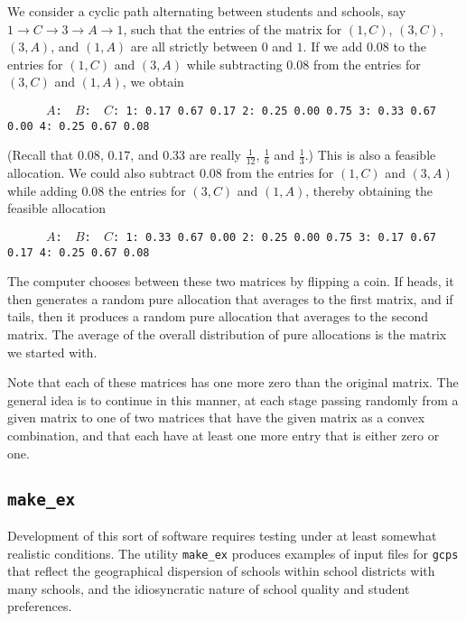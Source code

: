 \documentclass[12pt]{article}
\theoremstyle{definition}
\begin{document}
We consider a cyclic path alternating between students and
schools, say $1 \to C \to 3 \to A \to 1$, such that the entries of the
matrix for $(1,C)$, $(3,C)$, $(3,A)$, and $(1,A)$ are all strictly
between $0$ and $1$.  If we add $0.08$ to the entries for $(1,C)$ and
$(3,A)$ while subtracting $0.08$ from the entries for $(3,C)$ and
$(1,A)$, we obtain
\begin{obeylines}\texttt{
\ \ \ \ \ $A$:    \     $B$:  \  $C$:
1:      0.17     0.67     0.17
2:      0.25     0.00     0.75
3:      0.33     0.67     0.00
4:      0.25     0.67     0.08
}
\end{obeylines} \noindent
(Recall that $0.08$, $0.17$, and $0.33$ are really $\tfrac{1}{12}$,
$\tfrac16$ and $\tfrac13$.)  This is also a feasible allocation.  We
could also subtract $0.08$ from the entries for $(1,C)$ and $(3,A)$
while adding $0.08$ the entries for $(3,C)$ and $(1,A)$, thereby
obtaining the feasible allocation
\begin{obeylines}\texttt{
\ \ \ \ \ $A$:    \     $B$:  \      $C$:
1:      0.33     0.67     0.00
2:      0.25     0.00     0.75
3:      0.17     0.67     0.17
4:      0.25     0.67     0.08
}
\end{obeylines} \noindent

The computer chooses between these two matrices by flipping a coin.
If heads, it then generates a random pure allocation that averages to
the first matrix, and if tails, then it produces a random pure
allocation that averages to the second matrix.  The average of the
overall distribution of pure allocations is the matrix we started
with.

Note that each of these matrices has one more zero than the original
matrix.  The general idea is to continue in this manner, at each stage
passing randomly from a given matrix to one of two matrices that have
the given matrix as a convex combination, and that each have at least
one more entry that is either zero or one.

\subsection{\texttt{make\_ex}} \label{sec:MakeEx}

Development of this sort of software requires testing under at least
somewhat realistic conditions.  The utility \texttt{make\_ex} produces
examples of input files for \texttt{gcps} that reflect the
geographical dispersion of schools within school districts with many
schools, and the idiosyncratic nature of school quality and student
preferences.
\end{document}
